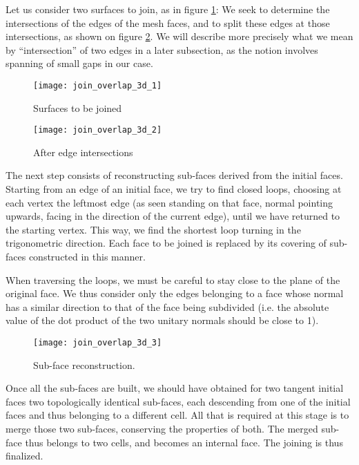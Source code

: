 Let us consider two surfaces to join, as in figure \ref{fig:algo.join.curv}:
We seek to determine the intersections of the edges of the mesh faces,
and to split these edges at those intersections, as shown on figure
\ref{fig:algo.join.curv2}. We will describe more precisely what we
mean by ``intersection'' of two edges in a later subsection, as
the notion involves spanning of small gaps in our case.

\begin{figure}[!h]
\centerline{
\texttt{[image: join\_overlap\_3d\_1]}}
\caption{Surfaces to be joined}
\label{fig:algo.join.curv}
\end{figure}

\begin{figure}[!h]
\centerline{
\texttt{[image: join\_overlap\_3d\_2]}}
\caption{After edge intersections}
\label{fig:algo.join.curv2}
\end{figure}

The next step consists of reconstructing sub-faces derived from the
initial faces. Starting from an edge of an initial face, we try to find
closed loops, choosing at each vertex the leftmost edge (as seen standing
on that face, normal pointing upwards, facing in the direction of the
current edge), until we have returned to the starting vertex. This way,
we find the shortest loop turning in the trigonometric
direction. Each face to be joined is replaced by its covering of
sub-faces constructed in this manner.

When traversing the loops, we must be careful to stay close to the plane
of the original face. We thus consider only the edges belonging to a face
whose normal has a similar direction to that of the face being subdivided
(i.e. the absolute value of the dot product of the two unitary normals
should be close to 1).

\begin{figure}[!h]
\centerline{
\texttt{[image: join\_overlap\_3d\_3]}}
\caption{Sub-face reconstruction.}
\label{fig:algo.join.curv3}
\end{figure}

Once all the sub-faces are built, we should have obtained for two tangent
initial faces two topologically identical sub-faces, each descending
from one of the initial faces and thus belonging to a different cell.
All that is required at this stage is to merge those two sub-faces,
conserving the properties of both. The merged sub-face thus belongs to
two cells, and becomes an internal face. The joining is thus finalized.

